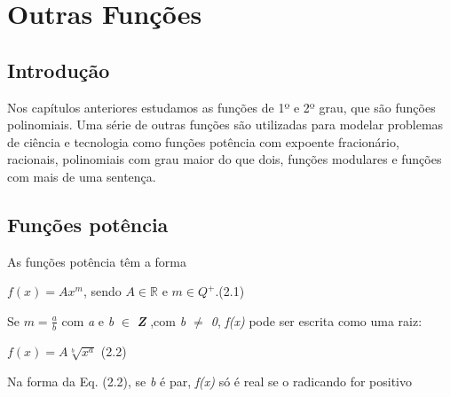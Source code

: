 \chapter{Outras Funções}
\section{Introdução}

\begin{justify}
\quad Nos capítulos anteriores estudamos as funções de 1º e 2º grau, que são funções polinomiais. Uma série de outras funções são utilizadas para modelar problemas de ciência e tecnologia como funções potência com expoente fracionário, racionais, polinomiais com grau maior do que dois, funções modulares e funções com mais de uma sentença.
\end{justify}

\section{Funções potência}

\begin{caixa}
\begin{tdefinicao}
As funções potência têm a forma 

\quad  \( f \left( x \right) = Ax^{m} \), sendo $A \in \mathbb{R}$ e $m \in Q^{+}.$\quad \quad \quad \quad (2.1)

Se  \( m=\frac{a}{b} \)  com \textit{a} e \textit{b} $ \in $  \textbf{\textit{Z}} ,com \textit{b $ \neq $  0}, \textit{f(x)} pode ser escrita como uma raiz:

\quad  \( f \left( x \right) =A\sqrt[b]{x^{a}} \) \quad \quad \quad \quad \quad \quad \quad \quad (2.2)

\quad Na forma da Eq. (2.2), se \textit{b} é par, \textit{f(x)} só é real se o radicando for positivo \qedsymbol{} 
\end{tdefinicao}
\end{caixa}

